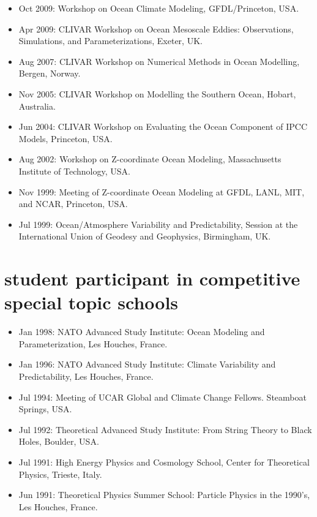 \documentclass{article}
\begin{document}
\begin{itemize}[leftmargin=*]
\item Oct 2009: {\sc Workshop on Ocean Climate Modeling},
  GFDL/Princeton, USA.

 \item Apr 2009: {\sc CLIVAR Workshop on Ocean Mesoscale Eddies:
    Observations, Simulations, and Parameterizations}, Exeter, UK.

\item Aug 2007: {\sc CLIVAR Workshop on Numerical Methods in Ocean
  Modelling}, Bergen, Norway.

\item Nov 2005: {\sc CLIVAR Workshop on Modelling the Southern
  Ocean}, Hobart, Australia.

\item Jun 2004: {\sc CLIVAR Workshop on Evaluating the Ocean
  Component of IPCC Models}, Princeton, USA.

\item Aug 2002: {\sc Workshop on Z-coordinate Ocean Modeling},
Massachusetts Institute of Technology, USA.

\item Nov 1999: {\sc Meeting of Z-coordinate Ocean Modeling at GFDL,
  LANL, MIT, and NCAR}, Princeton, USA.

\item Jul 1999: {\sc Ocean/Atmosphere Variability and
  Predictability}, Session at the International Union of Geodesy and
Geophysics, Birmingham, UK.

\end{itemize}


\section*{\sc \color{Maroon}  student participant in competitive special topic schools}
\vspace{-.3cm}

\begin{itemize}[leftmargin=*]

\item Jan 1998: NATO Advanced Study Institute: {\sc Ocean Modeling
    and Parameterization}, Les Houches, France.

\item Jan 1996: NATO Advanced Study Institute: {\sc Climate
  Variability and Predictability}, Les Houches, France.

\item Jul 1994: Meeting of UCAR Global and Climate Change Fellows.
Steamboat Springs, USA.  

\item Jul 1992: Theoretical Advanced Study Institute: {\sc From
  String Theory to Black Holes}, Boulder, USA.

\item Jul 1991: High Energy Physics and Cosmology School, Center for
Theoretical Physics, Trieste, Italy.

\item Jun 1991: Theoretical Physics Summer School: {\sc Particle
  Physics in the 1990's}, Les Houches, France.

\end{itemize}


%

\end{document}
